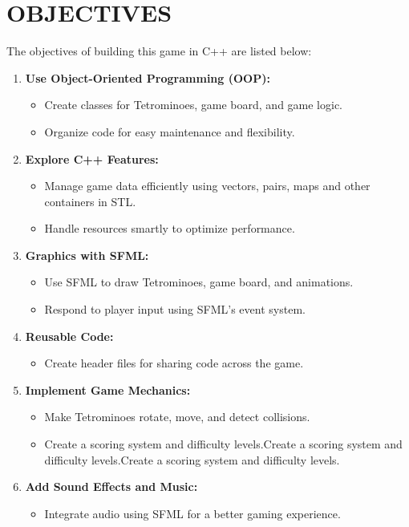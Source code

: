 \newpage
\section{OBJECTIVES}
The objectives of building this game in C++ are listed below:


\begin{enumerate}
\item \textbf{Use Object-Oriented Programming (OOP):}
	\begin{itemize}
		\item Create classes for Tetrominoes, game board, and game logic.
		\item Organize code for easy maintenance and flexibility.
	\end{itemize}
	
\item \textbf{Explore C++ Features:}
\begin{itemize}
	\item Manage game data efficiently using vectors, pairs, maps and other containers in STL.
	\item Handle resources smartly to optimize performance.
\end{itemize}

\item \textbf{Graphics with SFML:}
\begin{itemize}
	\item Use SFML to draw Tetrominoes, game board, and animations.
	\item Respond to player input using SFML's event system.
\end{itemize}

\item \textbf{Reusable Code:}
\begin{itemize}
	\item Create header files for sharing code across the game.
\end{itemize}

\item \textbf{Implement Game Mechanics:}
\begin{itemize}
	\item Make Tetrominoes rotate, move, and detect collisions.
	\item Create a scoring system and difficulty levels.Create a scoring system and difficulty levels.Create a scoring system and difficulty levels.
\end{itemize}

\item \textbf{Add Sound Effects and Music:}
\begin{itemize}
	\item Integrate audio using SFML for a better gaming experience.
\end{itemize}


\end{enumerate}
